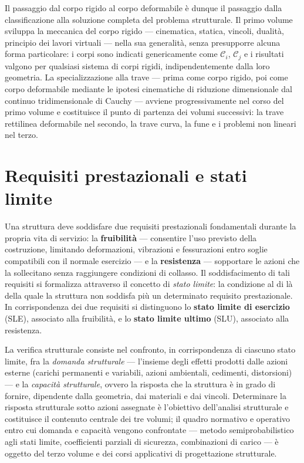 Il passaggio dal corpo rigido al corpo deformabile è dunque il passaggio dalla classificazione alla soluzione completa del problema strutturale. Il primo volume sviluppa la meccanica del corpo rigido --- cinematica, statica, vincoli, dualità, principio dei lavori virtuali --- nella sua generalità, senza presupporre alcuna forma particolare: i corpi sono indicati genericamente come $\mathcal{C}_i$, $\mathcal{C}_j$ e i risultati valgono per qualsiasi sistema di corpi rigidi, indipendentemente dalla loro geometria. La specializzazione alla trave --- prima come corpo rigido, poi come corpo deformabile mediante le ipotesi cinematiche di riduzione dimensionale dal continuo tridimensionale di Cauchy --- avviene progressivamente nel corso del primo volume e costituisce il punto di partenza dei volumi successivi: la trave rettilinea deformabile nel secondo, la trave curva, la fune e i problemi non lineari nel terzo.

\section{Requisiti prestazionali e stati limite}

Una struttura deve soddisfare due requisiti prestazionali fondamentali durante la propria vita di servizio: la \textbf{fruibilità} --- consentire l'uso previsto della costruzione, limitando deformazioni, vibrazioni e fessurazioni entro soglie compatibili con il normale esercizio --- e la \textbf{resistenza} --- sopportare le azioni che la sollecitano senza raggiungere condizioni di collasso. Il soddisfacimento di tali requisiti si formalizza attraverso il concetto di \textit{stato limite}: la condizione al di là della quale la struttura non soddisfa più un determinato requisito prestazionale. In corrispondenza dei due requisiti si distinguono lo \textbf{stato limite di esercizio} (SLE), associato alla fruibilità, e lo \textbf{stato limite ultimo} (SLU), associato alla resistenza.

La verifica strutturale consiste nel confronto, in corrispondenza di ciascuno stato limite, fra la \textit{domanda strutturale} --- l'insieme degli effetti prodotti dalle azioni esterne (carichi permanenti e variabili, azioni ambientali, cedimenti, distorsioni) --- e la \textit{capacità strutturale}, ovvero la risposta che la struttura è in grado di fornire, dipendente dalla geometria, dai materiali e dai vincoli. Determinare la risposta strutturale sotto azioni assegnate è l'obiettivo dell'analisi strutturale e costituisce il contenuto centrale dei tre volumi; il quadro normativo e operativo entro cui domanda e capacità vengono confrontate --- metodo semiprobabilistico agli stati limite, coefficienti parziali di sicurezza, combinazioni di carico --- è oggetto del terzo volume e dei corsi applicativi di progettazione strutturale.

